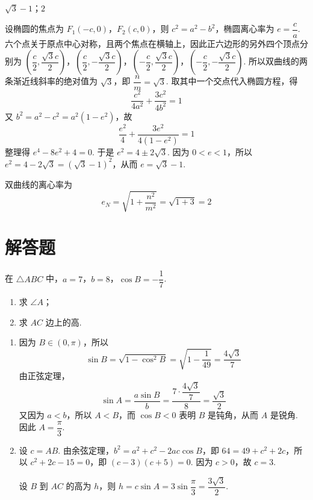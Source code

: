 \begin{answer}
\(\sqrt3-1\)；\(2\)
\end{answer}

\begin{solution}
设椭圆的焦点为 \(F_1(-c,0)\)，\(F_2(c,0)\)，则 \(c^2=a^2-b^2\)，椭圆离心率为 \(e=\dfrac ca\). 六个点关于原点中心对称，且两个焦点在横轴上，因此正六边形的另外四个顶点分别为
\(\left(\dfrac c2,\dfrac{\sqrt3c}{2}\right)\)，\(\left(\dfrac c2,-\dfrac{\sqrt3c}{2}\right)\)，\(\left(-\dfrac c2,\dfrac{\sqrt3c}{2}\right)\)，\(\left(-\dfrac c2,-\dfrac{\sqrt3c}{2}\right)\).
所以双曲线的两条渐近线斜率的绝对值为 \(\sqrt3\)，即 \(\dfrac nm=\sqrt3\). 取其中一个交点代入椭圆方程，得
\[
\frac{c^2}{4a^2}+\frac{3c^2}{4b^2}=1
\]
又 \(b^2=a^2-c^2=a^2(1-e^2)\)，故
\[
\frac{e^2}{4}+\frac{3e^2}{4(1-e^2)}=1
\]
整理得 \(e^4-8e^2+4=0\). 于是
\(e^2=4\pm2\sqrt3\). 因为 \(0<e<1\)，所以
\(e^2=4-2\sqrt3=(\sqrt3-1)^2\)，从而 \(e=\sqrt3-1\).

双曲线的离心率为
\[
e_N=\sqrt{1+\frac{n^2}{m^2}}=\sqrt{1+3}=2
\]
\end{solution}

\section{解答题}

\begin{problem}
在 \(\triangle ABC\) 中，\(a=7\)，\(b=8\)，\(\cos B=-\dfrac17\).

\begin{enumerate}
    \item 求 \(\angle A\)；
    \item 求 \(AC\) 边上的高.
\end{enumerate}
\end{problem}

\begin{solution}
\begin{enumerate}
    \item 因为 \(B\in(0,\pi)\)，所以
    \[
    \sin B=\sqrt{1-\cos^2B}=\sqrt{1-\dfrac1{49}}=\dfrac{4\sqrt3}{7}
    \]
    由正弦定理，
    \[
    \sin A=\dfrac{a\sin B}{b}=\dfrac{7\cdot\dfrac{4\sqrt3}{7}}8=\dfrac{\sqrt3}{2}
    \]
    又因为 \(a<b\)，所以 \(A<B\)，而 \(\cos B<0\) 表明 \(B\) 是钝角，从而 \(A\) 是锐角. 因此 \(A=\dfrac\pi3\).
    \item 设 \(c=AB\). 由余弦定理，\(b^2=a^2+c^2-2ac\cos B\)，即 \(64=49+c^2+2c\)，所以 \(c^2+2c-15=0\)，即 \((c-3)(c+5)=0\). 因为 \(c>0\)，故 \(c=3\).

    设 \(B\) 到 \(AC\) 的高为 \(h\)，则 \(h=c\sin A=3\sin\dfrac\pi3=\dfrac{3\sqrt3}{2}\).
\end{enumerate}
\end{solution}

